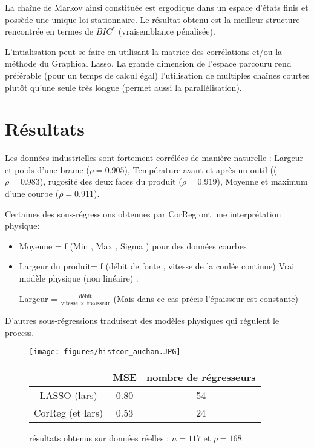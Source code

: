 \documentclass[12pt]{article}
\begin{document}
		La chaîne de Markov ainsi constituée est ergodique dans un espace d'états finis et possède une unique loi stationnaire.
		Le résultat obtenu est la meilleur structure rencontrée en termes de $BIC^*$ (vraisemblance pénalisée). 
 
L'intialisation peut se faire en utilisant la matrice des corrélations et/ou la méthode du Graphical Lasso\cite{friedman2008sparse}.		
La grande dimension de l'espace parcouru rend préférable  (pour un temps de calcul égal) l'utilisation de multiples chaînes courtes plutôt qu'une seule très longue (permet aussi la parallélisation).

\section{Résultats}	
Les données industrielles sont fortement corrélées de manière naturelle : Largeur et poids d'une brame ($\rho=0.905$), Température avant et après un outil (($\rho=0.983$), rugosité des deux faces du produit ($\rho=0.919$), Moyenne et maximum d'une courbe ($\rho=0.911$).
			
Certaines des sous-régressions obtenues par CorReg ont une interprétation physique:
\begin{itemize}
	\item Moyenne = f (Min , Max , Sigma ) pour des données courbes
	\item Largeur du produit= f (débit de fonte , vitesse de la coulée continue)	
Vrai modèle physique (non linéaire) :

	 Largeur = $\frac{\textrm{débit}}{\textrm{vitesse } \times \textrm{ épaisseur}}$ (Mais dans ce cas précis l'épaisseur est constante)
			\end{itemize}
			
			D'autres sous-régressions traduisent des modèles physiques qui régulent le process.


\begin{figure}[!h]
	\begin{minipage}[c]{.40\linewidth}
			\texttt{[image: figures/histcor\_auchan.JPG]} 
	\end{minipage} \hfill
   \begin{minipage}[c]{.52\linewidth}
		\begin{tabular}{|c|c|c|}
		\hline 
		  & MSE  & nombre de régresseurs  \\ 
		\hline
		LASSO (lars) & 0.80 & 54 \\ 
		\hline 
		CorReg (et lars) & 0.53 & 24  \\ 
		\hline 
		\end{tabular} 
   \end{minipage}
   \caption{résultats obtenus sur données réelles : $n=117$ et $p=168$.    }
\end{figure}   
	
\end{document}

